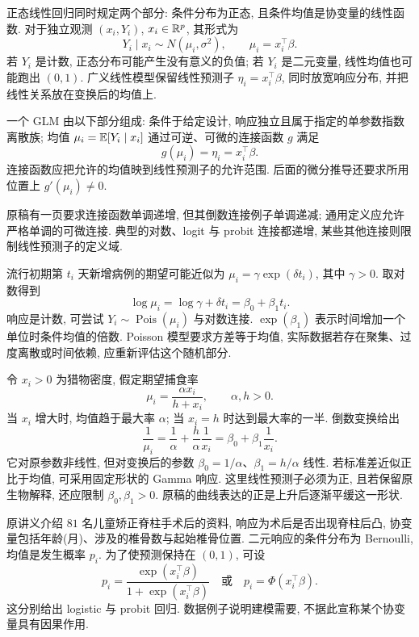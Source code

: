 \label{chap:glm}

正态线性回归同时规定两个部分: 条件分布为正态, 且条件均值是协变量的线性函数. 对于独立观测 $(x_i,Y_i)$, $x_i\in\mathbb R^p$, 其形式为
\[
 Y_i\mid x_i\sim N(\mu_i,\sigma^2),\qquad \mu_i=x_i^\top\beta.
\]
若 $Y_i$ 是计数, 正态分布可能产生没有意义的负值; 若 $Y_i$ 是二元变量, 线性均值也可能跑出 $(0,1)$. 广义线性模型保留线性预测子 $\eta_i=x_i^\top\beta$, 同时放宽响应分布, 并把线性关系放在变换后的均值上. 

\begin{definition}[广义线性模型]
一个 GLM 由以下部分组成: 条件于给定设计, 响应独立且属于指定的单参数指数离散族; 均值 $\mu_i=\mathbb E[Y_i\mid x_i]$ 通过可逆、可微的连接函数 $g$ 满足
\[
 g(\mu_i)=\eta_i=x_i^\top\beta.
\]
连接函数应把允许的均值映到线性预测子的允许范围. 后面的微分推导还要求所用位置上 $g'(\mu_i)\ne0$. 
\end{definition}
原稿有一页要求连接函数单调递增, 但其倒数连接例子单调递减; 通用定义应允许严格单调的可微连接. 典型的对数、logit 与 probit 连接都递增, 某些其他连接则限制线性预测子的定义域. 

\begin{example}
流行初期第 $t_i$ 天新增病例的期望可能近似为 $\mu_i=\gamma\exp(\delta t_i)$, 其中 $\gamma>0$. 取对数得到
\[
 \log\mu_i=\log\gamma+\delta t_i=\beta_0+\beta_1t_i.
\]
响应是计数, 可尝试 $Y_i\sim\operatorname{Pois}(\mu_i)$ 与对数连接. $\exp(\beta_1)$ 表示时间增加一个单位时条件均值的倍数. Poisson 模型要求方差等于均值, 实际数据若存在聚集、过度离散或时间依赖, 应重新评估这个随机部分. 
\end{example}

\begin{example}
令 $x_i>0$ 为猎物密度, 假定期望捕食率
\[
 \mu_i=\frac{\alpha x_i}{h+x_i},\qquad\alpha,h>0.
\]
当 $x_i$ 增大时, 均值趋于最大率 $\alpha$; 当 $x_i=h$ 时达到最大率的一半. 倒数变换给出
\[
 \frac1{\mu_i}=\frac1\alpha+\frac h\alpha\frac1{x_i}
              =\beta_0+\beta_1\frac1{x_i}.
\]
它对原参数非线性, 但对变换后的参数 $\beta_0=1/\alpha$、$\beta_1=h/\alpha$ 线性. 若标准差近似正比于均值, 可采用固定形状的 Gamma 响应. 这里线性预测子必须为正, 且若保留原生物解释, 还应限制 $\beta_0,\beta_1>0$. 原稿的曲线表达的正是上升后逐渐平缓这一形状. 
\end{example}

\begin{example}
原讲义介绍 $81$ 名儿童矫正脊柱手术后的资料, 响应为术后是否出现脊柱后凸, 协变量包括年龄(月)、涉及的椎骨数与起始椎骨位置. 二元响应的条件分布为 Bernoulli, 均值是发生概率 $p_i$. 为了使预测保持在 $(0,1)$, 可设
\[
 p_i=\frac{\exp(x_i^\top\beta)}{1+\exp(x_i^\top\beta)}
 \quad\text{或}\quad p_i=\Phi(x_i^\top\beta).
\]
这分别给出 logistic 与 probit 回归. 数据例子说明建模需要, 不据此宣称某个协变量具有因果作用. 
\end{example}

